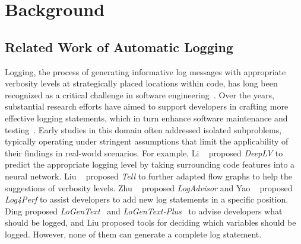 \section{Background}
\label{sec:moti}

\subsection{Related Work of Automatic Logging}
Logging, the process of generating informative log messages with appropriate verbosity levels at strategically placed locations within code, has long been recognized as a critical challenge in software engineering~\cite{he2021survey, Chen2019ExtractingAS, Chen2021ASO, Chen2021ExperienceRD}. Over the years, substantial research efforts have aimed to support developers in crafting more effective logging statements, which in turn enhance software maintenance and testing~\cite{Jia2018SMARTLOGPE, Zhao2017Log20FA, Zhu2015LearningTL}. Early studies in this domain often addressed isolated subproblems, typically operating under stringent assumptions that limit the applicability of their findings in real-world scenarios. For example, Li \etal~\cite{Li2021DeepLVSL} proposed \textit{DeepLV} to predict the appropriate logging level by taking surrounding code features into a neural network. Liu \etal~\cite{Liu2022TeLLLL} proposed \textit{Tell} to further adapted flow graphs to help the suggestions of verbosity levels. Zhu \etal~\cite{Zhu2015LearningTL} proposed \textit{LogAdvisor} and Yao \etal~\cite{Yao2019Log4PerfSA} proposed \textit{Log4Perf} to assist developers to add new log statements in a specific position. Ding \etal proposed \textit{LoGenText}~\cite{Ding2022LoGenTextAG} and \textit{LoGenText-Plus}~\cite{Ding2023LoGenTextPlusIN} to advise developers what should be logged, and Liu \etal \cite{Liu2021WhichVS} proposed tools for deciding which variables should be logged. However, none of them can generate a complete log statement. 

